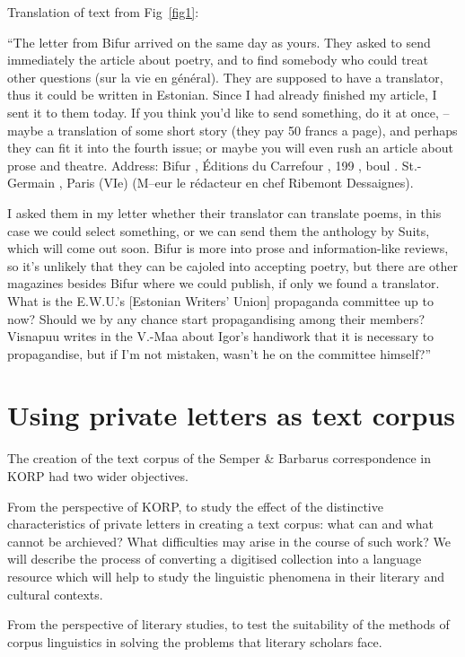 \documentclass[runningheads]{llncs}
\begin{document}
Translation of text from Fig~\ref{fig1}:

``The letter from Bifur arrived on the same day as yours. They asked to send immediately the article about poetry, and to find somebody who could treat other questions (sur la vie en g\'en\'eral). They are supposed to have a translator, thus it could be written in Estonian. Since I had already finished my article, I sent it to them today. If you think you’d like to send something, do it at once, – maybe a translation of some short story (they pay 50 francs a page), and perhaps they can fit it into the fourth issue; or maybe you will even rush an article about prose and theatre. Address: Bifur , \'Editions du Carrefour , 199 , boul . St.-Germain , Paris (VIe) (M–eur le r\'edacteur en chef Ribemont Dessaignes).

I asked them in my letter whether their translator can translate poems, in this case we could select something, or we can send them the anthology by Suits, which will come out soon. Bifur is more into prose and information-like reviews, so it’s unlikely that they can be cajoled into accepting poetry, but there are other magazines besides Bifur where we could publish, if only we found a translator. What is the E.W.U.’s [Estonian Writers’ Union] propaganda committee up to now? Should we by any chance start propagandising among their members? Visnapuu writes in the V.-Maa about Igor’s handiwork that it is necessary to propagandise, but if I’m not mistaken, wasn’t he on the committee himself?''




\section{Using private letters as text corpus}

The creation of the text corpus of the Semper \& Barbarus correspondence in KORP had two wider objectives.  

From the perspective of KORP, to study the effect of the distinctive characteristics of private letters in creating a text corpus: what can and what cannot be archieved? What difficulties may arise in the course of such work? We will describe the process of converting a digitised collection into a language resource which will help to study the linguistic phenomena in their literary and cultural contexts.

From the perspective of literary studies, to test the suitability of the methods of corpus linguistics in solving the problems that literary scholars face.
\end{document}
